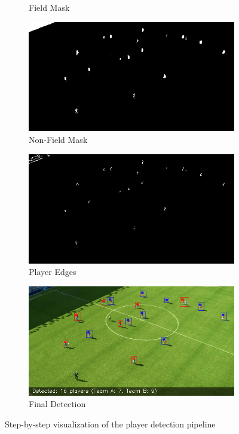 \documentclass[10pt,twocolumn,letterpaper]{article}
\begin{document}
\begin{figure}[t]
\begin{subfigure}[b]{0.48\linewidth}
    \caption{Field Mask}
  \end{subfigure}
  \begin{subfigure}[b]{0.48\linewidth}
    \centering
    \includegraphics[width=\linewidth]{../edge_detection_steps/06_non_field_mask.jpg}
    \caption{Non-Field Mask}
  \end{subfigure}
  \begin{subfigure}[b]{0.48\linewidth}
    \centering
    \includegraphics[width=\linewidth]{../edge_detection_steps/07_player_edges.jpg}
    \caption{Player Edges}
  \end{subfigure}
  \begin{subfigure}[b]{0.48\linewidth}
    \centering
    \includegraphics[width=\linewidth]{../edge_detection_steps/09_final_image_2.png}
    \caption{Final Detection}
  \end{subfigure}
  \caption{Step-by-step visualization of the player detection pipeline}
  \label{fig:detection_steps}
\end{figure}
\end{document}
